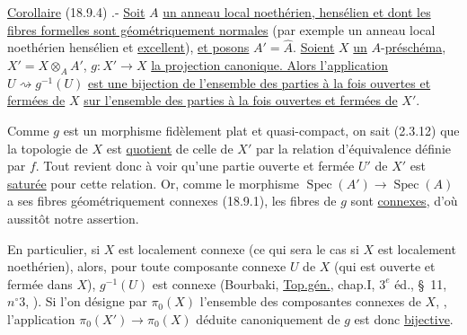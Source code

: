 \uline{Corollaire} (18.9.4) .- \uline{Soit} $A$ \uline{un anneau local noethérien, hensélien et dont les fibres formelles sont géométriquement normales}  (par exemple un anneau local noethérien hensélien et \uline{excellent}), \uline{et posons} $A'=\hat A$. \uline{Soient} $X$ \uline{un} $A$-\uline{préschéma}, $X'=X\otimes_A A'$, $g:X'\to X$ \uline{la projection canonique. Alors l'application} $U\rightsquigarrow g^{-1}(U)$ \uline{est une bijection de l'ensemble des parties à la fois ouvertes et fermées de} $X$ \uline{sur l'ensemble des parties à la fois ouvertes et fermées de} $X'$.

Comme $g$ est un morphisme  fidèlement plat et quasi-compact, on sait (2.3.12) que la topologie de $X$ est \uline{quotient} de celle de $X'$ par la relation d'équivalence définie par $f$. Tout revient donc à voir  qu'une partie ouverte et fermée $U'$ de $X'$ est \uline{saturée} pour cette relation. Or, comme le morphisme $\operatorname{Spec}(A')\to\operatorname{Spec}(A)$  a ses fibres géométriquement connexes (18.9.1), les fibres de $g$ sont \uline{connexes}, d'où aussitôt notre assertion.

En particulier, si $X$ est localement connexe (ce qui sera le cas si $X$ est localement noethérien), alors, pour toute  composante connexe $U$ de $X$ (qui est ouverte et fermée dans $X$), $g^{-1}(U)$ est connexe (Bourbaki, \uline{Top.gén.}, chap.I, $3^e$ éd., \S\ 11, $n^\circ3$, ). Si l'on désigne par $\pi_0(X)$ l'ensemble des composantes connexes de $X$, , l'application $\pi_0(X')\to\pi_0(X)$ déduite canoniquement de $g$ est donc \uline{bijective}.

